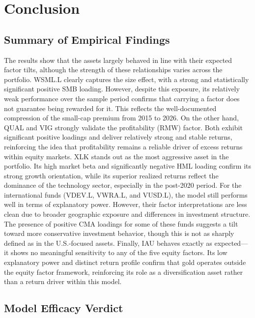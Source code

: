 \documentclass[12pt]{article}
\begin{document}
\section{Conclusion}

\subsection{Summary of Empirical Findings}

The results show that the assets largely behaved in line with their expected factor tilts, although the strength of these relationships varies across the portfolio. WSML.L clearly captures the size effect, with a strong and statistically significant positive SMB loading. However, despite this exposure, its relatively weak performance over the sample period confirms that carrying a factor does not guarantee being rewarded for it. This reflects the well-documented compression of the small-cap premium from 2015 to 2026.
On the other hand, QUAL and VIG strongly validate the profitability (RMW) factor. Both exhibit significant positive loadings and deliver relatively strong and stable returns, reinforcing the idea that profitability remains a reliable driver of excess returns within equity markets.
XLK stands out as the most aggressive asset in the portfolio. Its high market beta and significantly negative HML loading confirm its strong growth orientation, while its superior realized returns reflect the dominance of the technology sector, especially in the post-2020 period.
For the international funds (VDEV.L, VWRA.L, and VUSD.L), the model still performs well in terms of explanatory power. However, their factor interpretations are less clean due to broader geographic exposure and differences in investment structure. The presence of positive CMA loadings for some of these funds suggests a tilt toward more conservative investment behavior, though this is not as sharply defined as in the U.S.-focused assets.
Finally, IAU behaves exactly as expected—it shows no meaningful sensitivity to any of the five equity factors. Its low explanatory power and distinct return profile confirm that gold operates outside the equity factor framework, reinforcing its role as a diversification asset rather than a return driver within this model.

\subsection{Model Efficacy Verdict}
\end{document}
